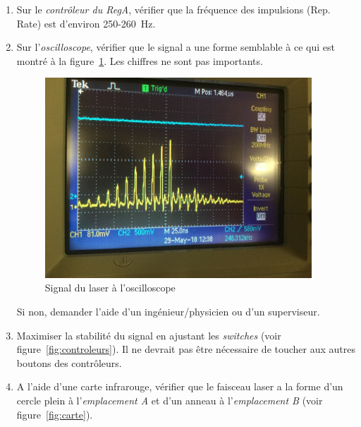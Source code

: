 \begin{enumerate}
\begin{itemize}
        \item[$\bullet$] Vérifier que le \textit{robinet gris} et le \textit{robinet vert} sont positionnés comme sur la figure~\ref{fig:azote}.
        \item[$\bullet$] Tourner le \textit{robinet noir}, "suffisamment pour entendre le jet quand on approche son oreille et qu'on prête attention, mais le son ne doit pas non plus être trop fort"\footnote{François Côté, 2018}.
        \item[$\bullet$] Une fois le pourcentage d'humidité rétabli, remettre le \textit{robinet noir} à sa position initiale.
        \item[$\bullet$] Si le pourcentage d'humidité demeure élevé, il se peut qu'il y ait une fuite dans le système. Demander l'aide d'un ingénieur/physicien ou d'un superviseur.
        \end{itemize}
    \item Sur le \textit{contrôleur du RegA}, vérifier que la fréquence des impulsions (Rep. Rate) est d'environ 250-260~Hz.
    \item Sur l'\textit{oscilloscope}, vérifier que le signal a une forme semblable à ce qui est montré à la figure~\ref{fig:oscilloscope}. Les chiffres ne sont pas importants.
        \begin{figure}[H]
        \centering
        \includegraphics[width=10cm]{oscilloscope.jpg}
        \caption{Signal du laser à l'oscilloscope}
        \label{fig:oscilloscope}
        \end{figure}
    Si non, demander l'aide d'un ingénieur/physicien ou d'un superviseur.
   \item Maximiser la stabilité du signal en ajustant les \textit{switches} (voir figure~\ref{fig:controleurs}). Il ne devrait pas être nécessaire de toucher aux autres boutons des contrôleurs.
   \item A l'aide d'une carte infrarouge, vérifier que le faisceau laser a la forme d'un cercle plein à l'\textit{emplacement A} et d'un anneau à l'\textit{emplacement B} (voir figure~\ref{fig:carte}).

\end{enumerate}

